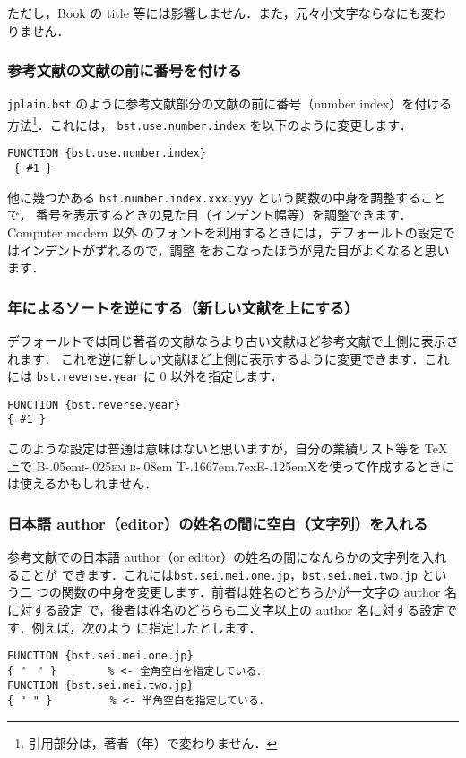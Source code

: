 \documentclass[article]{jlreq}
\newcommand{\BibTeX}{\textrm{B\kern-.05em\textsc{i\kern-.025em b}\kern-.08em%
T\kern-.1667em\lower.7ex\hbox{E}\kern-.125emX}}
\begin{document}
ただし，Book の title 等には影響しません．また，元々小文字ならなにも変わ
りません．

\subsubsection{参考文献の文献の前に番号を付ける}

\texttt{jplain.bst} のように参考文献部分の文献の前に番号（number index）を付ける
方法\footnote{引用部分は，著者（年）で変わりません．}．これには，
\texttt{bst.use.number.index} を以下のように変更します．
\begin{screen}
\begin{verbatim}
FUNCTION {bst.use.number.index}
 { #1 }
\end{verbatim}
\end{screen}

他に幾つかある \texttt{bst.number.index.xxx.yyy} という関数の中身を調整することで，
番号を表示するときの見た目（インデント幅等）を調整できます．Computer modern 以外
のフォントを利用するときには，デフォールトの設定ではインデントがずれるので，調整
をおこなったほうが見た目がよくなると思います．

\subsubsection{年によるソートを逆にする（新しい文献を上にする）}

デフォールトでは同じ著者の文献ならより古い文献ほど参考文献で上側に表示されます．
これを逆に新しい文献ほど上側に表示するように変更できます．これには
\texttt{bst.reverse.year} に 0 以外を指定します．
\begin{screen}
\begin{verbatim}
FUNCTION {bst.reverse.year}
{ #1 }
\end{verbatim}
\end{screen}

このような設定は普通は意味はないと思いますが，自分の業績リスト等を \TeX 
上で \BibTeX を使って作成するときには使えるかもしれません．

\subsubsection{日本語 author（editor）の姓名の間に空白（文字列）を入れる}

参考文献での日本語 author（or editor）の姓名の間になんらかの文字列を入れることが
できます．これには\verb|bst.sei.mei.one.jp|，\verb|bst.sei.mei.two.jp| という二
つの関数の中身を変更します．前者は姓名のどちらかが一文字の author 名に対する設定
で，後者は姓名のどちらも二文字以上の author 名に対する設定です．例えば，次のよう
に指定したとします．
\begin{screen}
\begin{verbatim}
FUNCTION {bst.sei.mei.one.jp}
{ "　" }        % <- 全角空白を指定している．
FUNCTION {bst.sei.mei.two.jp}
{ " " }         % <- 半角空白を指定している．
\end{verbatim}
\end{screen}
\end{document}
